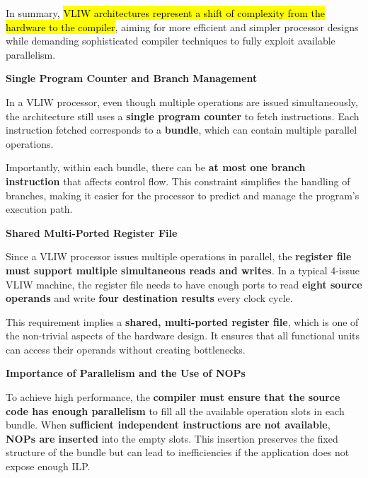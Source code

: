 \highspace
In summary, \hl{VLIW architectures represent a shift of complexity from the hardware to the compiler}, aiming for more efficient and simpler processor designs while demanding sophisticated compiler techniques to fully exploit available parallelism.

\highspace
\begin{flushleft}
    \textcolor{Green3}{ \textbf{Single Program Counter and Branch Management}}
\end{flushleft}
In a VLIW processor, even though multiple operations are issued simultaneously, the architecture still uses a \textbf{single program counter} to fetch instructions. Each instruction fetched corresponds to a \textbf{bundle}, which can contain multiple parallel operations.

\highspace
Importantly, within each bundle, there can be \textbf{at most one branch instruction} that affects control flow. This constraint simplifies the handling of branches, making it easier for the processor to predict and manage the program's execution path.

\newpage

\begin{flushleft}
    \textcolor{Green3}{ \textbf{Shared Multi-Ported Register File}}
\end{flushleft}
Since a VLIW processor issues multiple operations in parallel, the \textbf{register file must support multiple simultaneous reads and writes}. In a typical 4-issue VLIW machine, the register file needs to have enough ports to read \textbf{eight source operands} and write \textbf{four destination results} every clock cycle.

\highspace
This requirement implies a \textbf{shared, multi-ported register file}, which is one of the non-trivial aspects of the hardware design. It ensures that all functional units can access their operands without creating bottlenecks.

\highspace
\begin{flushleft}
    \textcolor{Green3}{ \textbf{Importance of Parallelism and the Use of NOPs}}
\end{flushleft}
To achieve high performance, the \textbf{compiler must ensure that the source code has enough parallelism} to fill all the available operation slots in each bundle. When \textbf{sufficient independent instructions are not available}, \textbf{NOPs are inserted} into the empty slots. This insertion preserves the fixed structure of the bundle but can lead to inefficiencies if the application does not expose enough ILP.

